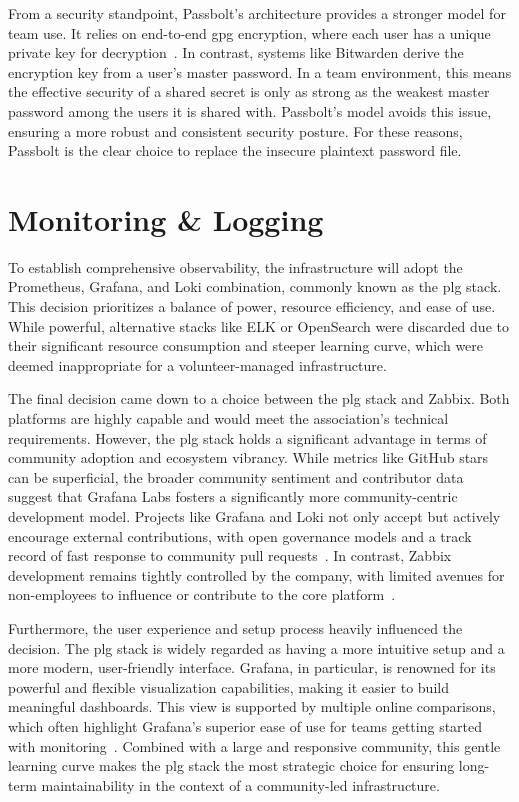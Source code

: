From a security standpoint, Passbolt's architecture provides a stronger model for team use. It relies on end-to-end \gls{gpg} encryption, where each user has a unique private key for decryption~\cite{passbolt-security}. In contrast, systems like Bitwarden derive the encryption key from a user's master password. In a team environment, this means the effective security of a shared secret is only as strong as the weakest master password among the users it is shared with. Passbolt's model avoids this issue, ensuring a more robust and consistent security posture. For these reasons, Passbolt is the clear choice to replace the insecure plaintext password file.

\section{Monitoring \& Logging}

To establish comprehensive observability, the infrastructure will adopt the Prometheus, Grafana, and Loki combination, commonly known as the \gls{plg} stack. This decision prioritizes a balance of power, resource efficiency, and ease of use. While powerful, alternative stacks like ELK or OpenSearch were discarded due to their significant resource consumption and steeper learning curve, which were deemed inappropriate for a volunteer-managed infrastructure.

The final decision came down to a choice between the \gls{plg} stack and Zabbix. Both platforms are highly capable and would meet the association's technical requirements. However, the \gls{plg} stack holds a significant advantage in terms of community adoption and ecosystem vibrancy. While metrics like GitHub stars can be superficial, the broader community sentiment and contributor data suggest that Grafana Labs fosters a significantly more community-centric development model. Projects like Grafana and Loki not only accept but actively encourage external contributions, with open governance models and a track record of fast response to community pull requests~\cite{collab-grafana}. In contrast, Zabbix development remains tightly controlled by the company, with limited avenues for non-employees to influence or contribute to the core platform~\cite{zabbix-dev-policy}.

Furthermore, the user experience and setup process heavily influenced the decision. The \gls{plg} stack is widely regarded as having a more intuitive setup and a more modern, user-friendly interface. Grafana, in particular, is renowned for its powerful and flexible visualization capabilities, making it easier to build meaningful dashboards. This view is supported by multiple online comparisons, which often highlight Grafana's superior ease of use for teams getting started with monitoring~\cite{squadcast-zabbix-grafana}. Combined with a large and responsive community, this gentle learning curve makes the \gls{plg} stack the most strategic choice for ensuring long-term maintainability in the context of a community-led infrastructure.

